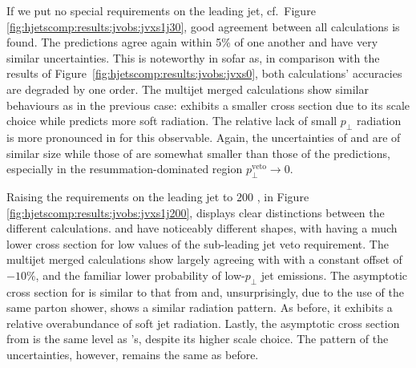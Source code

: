 If we put no special requirements on the leading jet, cf.\ Figure 
\ref{fig:hjetscomp:results:jvobs:jvxs1j30}, good agreement 
between all calculations is found. The \NNLOPS predictions agree again within 
5\% of one another and have very similar uncertainties. This is noteworthy 
in sofar as, in comparison with the results of 
Figure~\ref{fig:hjetscomp:results:jvobs:jvxs0}, both calculations' 
accuracies are degraded by one order. The multijet merged calculations 
show similar behaviours as in the previous case: \MGaMC exhibits a smaller cross section due to 
its scale choice while \Sherpa \MEPSatNLO predicts more soft radiation. 
The relative lack of small $p_\perp$ radiation is more 
pronounced in \Herwig for this observable. Again, the uncertainties of \MGaMC and \Sherpa 
are of similar size while those of \Herwig are somewhat smaller than those of the \NNLOPS 
predictions, especially in the resummation-dominated region 
$p_\perp^\text{veto}\to 0$.

Raising the requirements on the leading jet to $200$ \gev, in Figure 
\ref{fig:hjetscomp:results:jvobs:jvxs1j200}, displays clear distinctions 
between the different calculations.  
\Sherpa \NNLOPS and \Powheg \NNLOPS have noticeably different shapes, with \Sherpa having a 
much lower cross section for low values of the sub-leading jet veto requirement. 
The multijet merged calculations show \Herwig largely agreeing with 
\Powheg with a constant offset of $-10\%$, and the familiar lower 
probability of low-$p_\perp$ jet emissions. 
The asymptotic cross section for \Sherpa \MEPSatNLO is similar to that from \Sherpa \NNLOPS and, 
unsurprisingly, due to the use of the same parton shower, shows a 
similar radiation pattern. As before, it exhibits 
a relative overabundance of soft jet radiation. Lastly, the asymptotic cross section from \MGaMC 
is the same level as \Powheg's, despite 
its higher scale choice. The pattern of the uncertainties, however, 
remains the same as before.

